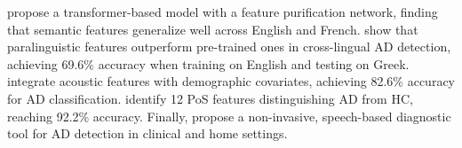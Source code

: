 \citet{liu2022improving} propose a transformer-based model with a feature purification network, finding that semantic features generalize well across English and French. \citet{chen2023cross} show that paralinguistic features outperform pre-trained ones in cross-lingual AD detection, achieving 69.6\% accuracy when training on English and testing on Greek. \citet{Tamm2023Cross-Lingual} integrate acoustic features with demographic covariates, achieving 82.6\% accuracy for AD classification. \citet{wen2023revealing} identify 12 PoS features distinguishing AD from HC, reaching 92.2\% accuracy. Finally, \citet{sadeghian2021towards} propose a non-invasive, speech-based diagnostic tool for AD detection in clinical and home settings.
